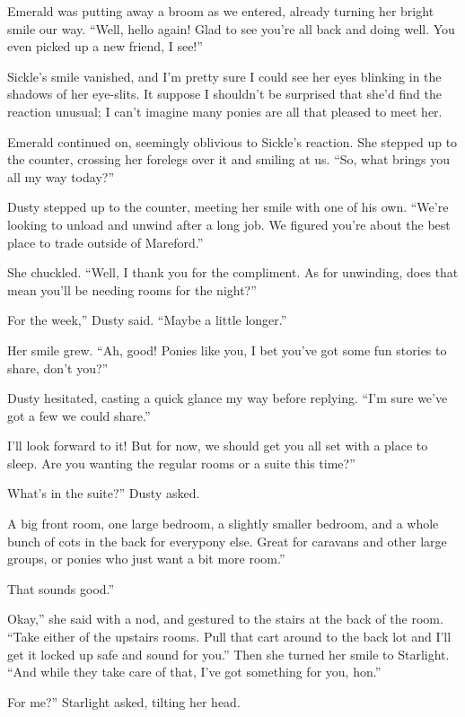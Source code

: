 Emerald was putting away a broom as we entered, already turning her bright smile our way. “Well, hello again! Glad to see you’re all back and doing well. You even picked up a new friend, I see!”

Sickle’s smile vanished, and I’m pretty sure I could see her eyes blinking in the shadows of her eye-slits. It suppose I shouldn’t be surprised that she’d find the reaction unusual; I can’t imagine many ponies are all that pleased to meet her.

Emerald continued on, seemingly oblivious to Sickle’s reaction. She stepped up to the counter, crossing her forelegs over it and smiling at us. “So, what brings you all my way today?”

Dusty stepped up to the counter, meeting her smile with one of his own. “We’re looking to unload and unwind after a long job. We figured you’re about the best place to trade outside of Mareford.”

She chuckled. “Well, I thank you for the compliment. As for unwinding, does that mean you’ll be needing rooms for the night?”

\leavevmode{}For the week,” Dusty said. “Maybe a little longer.”

Her smile grew. “Ah, good! Ponies like you, I bet you’ve got some fun stories to share, don’t you?”

Dusty hesitated, casting a quick glance my way before replying. “I’m sure we’ve got a few we could share.”

\leavevmode{}I’ll look forward to it! But for now, we should get you all set with a place to sleep. Are you wanting the regular rooms or a suite this time?”

\leavevmode{}What’s in the suite?” Dusty asked.

\leavevmode{}A big front room, one large bedroom, a slightly smaller bedroom, and a whole bunch of cots in the back for everypony else. Great for caravans and other large groups, or ponies who just want a bit more room.”

\leavevmode{}That sounds good.”

\leavevmode{}Okay,” she said with a nod, and gestured to the stairs at the back of the room. “Take either of the upstairs rooms. Pull that cart around to the back lot and I’ll get it locked up safe and sound for you.” Then she turned her smile to Starlight. “And while they take care of that, I’ve got something for you, hon.”

\leavevmode{}For me?” Starlight asked, tilting her head.

